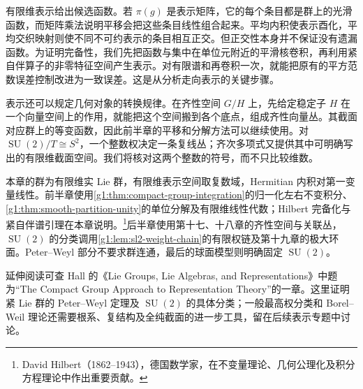 \ProseParagraphBreak

有限维表示给出候选函数。若 \(\pi(g)\) 是表示矩阵，它的每个条目都是群上的光滑函数，而矩阵乘法说明平移会把这些条目线性组合起来。平均内积使表示酉化，平均交织映射则使不同不可约表示的条目相互正交。但正交性本身并不保证没有遗漏函数。为证明完备性，我们先把函数与集中在单位元附近的平滑核卷积，再利用紧自伴算子的非零特征空间产生表示。对有限谱和再卷积一次，就能把原有的平方范数误差控制改进为一致误差。这是从分析走向表示的关键步骤。

\ProseParagraphBreak

表示还可以规定几何对象的转换规律。在齐性空间 \(G/H\) 上，先给定稳定子 \(H\) 在一个向量空间上的作用，就能把这个空间搬到各个底点，组成齐性向量丛。其截面对应群上的等变函数，因此前半章的平移和分解方法可以继续使用。对 \(\operatorname{SU}(2)/T\cong S^2\)，一个整数权决定一条复线丛；齐次多项式又提供其中可明确写出的有限维截面空间。我们将核对这两个整数的符号，而不只比较维数。

\ProseParagraphBreak

本章的群为有限维实 Lie 群，有限维表示空间取复数域，Hermitian 内积对第一变量线性。前半章使用\cref{g1:thm:compact-group-integration}的归一化左右不变积分、\cref{g1:thm:smooth-partition-unity}的单位分解及有限维线性代数；Hilbert 完备化与紧自伴谱引理在本章说明。\footnote{David Hilbert（1862--1943），德国数学家，在不变量理论、几何公理化及积分方程理论中作出重要贡献。}后半章使用第十七、十八章的齐性空间与关联丛，\(\operatorname{SU}(2)\) 的分类调用\cref{g1:lem:sl2-weight-chain}的有限权链及第十九章的极大环面。Peter--Weyl 部分不要求群连通，最后的球面模型则明确固定 \(\operatorname{SU}(2)\)。

\ProseParagraphBreak

延伸阅读可查 Hall 的《Lie Groups, Lie Algebras, and Representations》中题为“The Compact Group Approach to Representation Theory”的一章\cite{Hall2015}。这里证明紧 Lie 群的 Peter--Weyl 定理及 \(\operatorname{SU}(2)\) 的具体分类；一般最高权分类和 Borel--Weil 理论还需要根系、复结构及全纯截面的进一步工具，留在后续表示专题中讨论。







